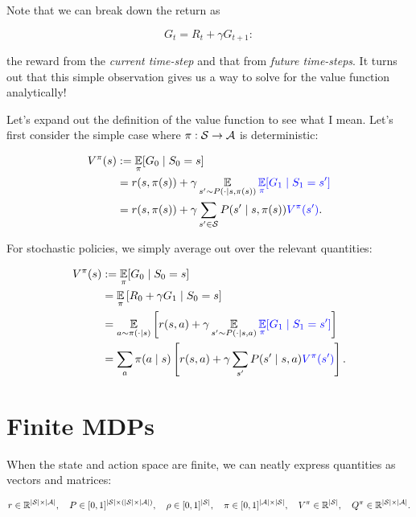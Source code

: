 \documentclass[../main/main]{subfiles}
\begin{document}
Note that we can break down the return as

\[
    G_t = R_t + \gamma G_{t+1}:
\]

the reward from the \emph{current time-step} and that from \emph{future time-steps}. It turns out that this simple observation gives us a way to solve for the value function analytically!

Let's expand out the definition of the value function to see what I mean. Let's first consider the simple case where $\pi : \mathcal{S} \to \mathcal{A}$ is deterministic:

\begin{align*}
    V^\pi(s) &:= \operatorname*{\mathbb{E}}_\pi[G_0 \mid S_0 = s] \\
    &= r(s, \pi(s)) + \gamma \operatorname*{\mathbb{E}}_{s' \sim P(\cdot \mid s, \pi(s))} {\color{blue} \operatorname*{\mathbb{E}}_\pi [G_1 \mid S_1 = s']} \\
    &= r(s, \pi(s)) + \gamma \sum_{s' \in \mathcal{S}} P(s' \mid s, \pi(s)) {\color{blue} V^\pi(s')}.
\end{align*}

For stochastic policies, we simply average out over the relevant quantities:

\begin{align*}
    V^\pi(s) &:= \operatorname*{\mathbb{E}}_\pi [G_0 \mid S_0 = s] \\
    &= \operatorname*{\mathbb{E}}_\pi \left[ R_0 + \gamma G_1 \mid S_0 = s \right] \\
    &= \operatorname*{\mathbb{E}}_{a \sim \pi(\cdot \mid s)} \left[ r(s, a) + \gamma \operatorname*{\mathbb{E}}_{s' \sim P(\cdot \mid s, a)}  {\color{blue} \operatorname*{\mathbb{E}}_\pi [G_1 \mid S_1 = s']} \right] \\
    &= \sum_a \pi(a \mid s) \left[r(s, a) + \gamma \sum_{s'} P(s' \mid s, a) {\color{blue} V^\pi(s')} \right].
\end{align*}




\section{Finite MDPs}

When the state and action space are finite, we can neatly express quantities as vectors and matrices:

\[
    r \in \mathbb{R}^{|\mathcal{S}| \times |\mathcal{A}|}, \quad P \in [0, 1]^{|\mathcal{S}| \times (|\mathcal{S}| \times |\mathcal{A}|)}, \quad \rho \in [0, 1]^{|\mathcal{S}|}, \quad \pi \in [0, 1]^{|\mathcal{A}| \times |\mathcal{S}|}, \quad V^\pi \in \mathbb{R}^{|\mathcal{S}|}, \quad Q^\pi \in \mathbb{R}^{|\mathcal{S}| \times |\mathcal{A}|}.
\]
\end{document}
